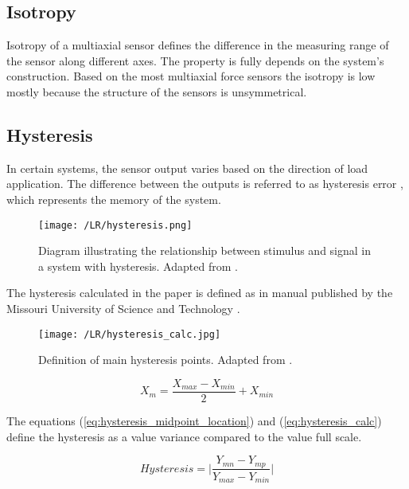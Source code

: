 \subsection{Isotropy}
Isotropy of a multiaxial sensor defines the difference in the measuring range of the sensor along different axes. The property is fully depends on the system's construction. 
Based on the \cite[Tab. 2, 3, 4]{multi_axis_force_sensors_review} most multiaxial force sensors the isotropy is low mostly because the structure of the sensors is unsymmetrical.

\subsection{Hysteresis}

In certain systems, the sensor output varies based on the direction of load application. 
The difference between the outputs is referred to as hysteresis error \cite{handbook_sensors}, which represents the memory of the system.
\begin{figure}[H]
    \centering
    \texttt{[image: /LR/hysteresis.png]}
    \caption{Diagram illustrating the relationship between stimulus and signal in a system with hysteresis. Adapted from \cite[Fig. 2.11]{handbook_sensors}.}
    \label{fig:hysteresis}
\end{figure}


The hysteresis calculated in the paper is defined as in manual published by the Missouri University of Science and Technology \cite{hysteresis_calc}.
\begin{figure}[H]
    \centering
    \texttt{[image: /LR/hysteresis\_calc.jpg]}
    \caption{Definition of main hysteresis points. Adapted from \cite[Fig. 3]{hysteresis_calc}.}
    \label{fig:hysteresis_calc}
\end{figure}
\begin{equation}
    X_m = \frac{X_{max} - X_{min}}{2} + X_{min}
    \label{eq:hysteresis_midpoint_location}
\end{equation}

The equations (\ref{eq:hysteresis_midpoint_location}) and (\ref*{eq:hysteresis_calc}) define the hysteresis as a value variance compared to the value full scale.  

\begin{equation}
    \textit{Hysteresis} = \big| \frac{Y_{mn} - Y_{mp}}{Y_{max} - Y_{min}} \big|
    \label{eq:hysteresis_calc}
\end{equation}


